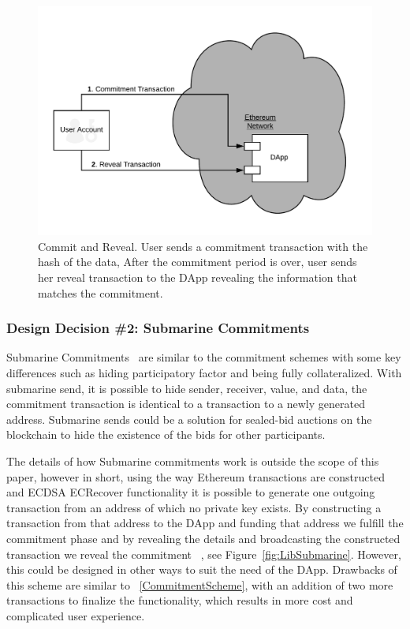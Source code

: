 \begin{figure}[h]
\centering
\includegraphics[width=0.5\linewidth]{figures/commit-reveal.png}
\caption{Commit and Reveal. User sends a commitment transaction with the hash of the data, After the commitment period is over, user sends her reveal transaction to the DApp revealing the information that matches the commitment. \label{fig:commitReveal}}
\end{figure}

\subsubsection{Design Decision \#2: Submarine Commitments\newline}\label{submarineCommits}
Submarine Commitments~\cite{breidenbach2018enter, submarinesendHD} are similar to the commitment schemes with some key differences such as hiding participatory factor and being fully collateralized. With submarine send, it is possible to hide sender, receiver, value, and data, the commitment transaction is identical to a transaction to a newly generated address. Submarine sends could be a solution for sealed-bid auctions on the blockchain to hide the existence of the bids for other participants. 

The details of how Submarine commitments work is outside the scope of this paper, however in short, using the way Ethereum transactions are constructed and ECDSA ECRecover functionality it is possible to generate one outgoing transaction from an address of which no private key exists. By constructing a transaction from that address to the DApp and funding that address we fulfill the commitment phase and by revealing the details and broadcasting the constructed transaction we reveal the commitment ~\cite{libsubmarine}, see Figure~\ref{fig:LibSubmarine}. However, this could be designed in other ways to suit the need of the DApp. Drawbacks of this scheme are similar to ~\ref{CommitmentScheme}, with an addition of two more transactions to finalize the functionality, which results in more cost and complicated user experience.


